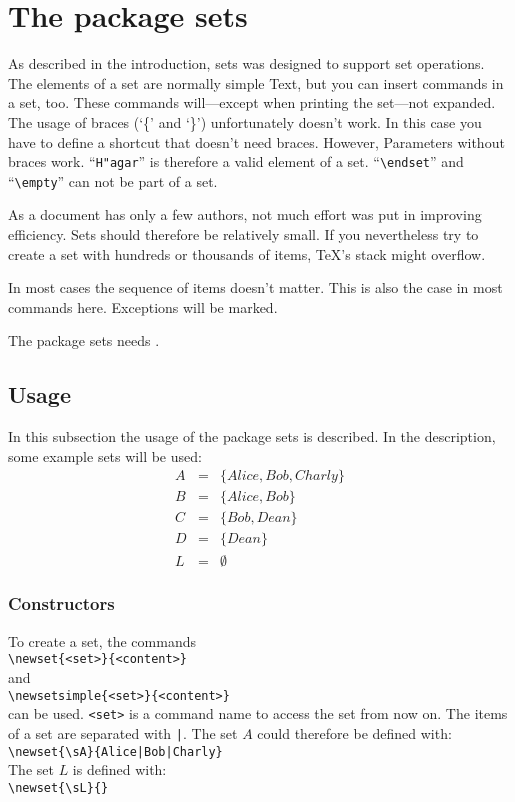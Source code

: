 \section{The package sets}\label{sets}

As described in the introduction, sets was designed to support set operations. The elements of a set are normally simple Text, but you can insert commands in a set, too.
These commands will---except when printing the set---not expanded.
The usage of braces (`\{' and `\}') unfortunately doesn't work. In this case you have to define a shortcut that doesn't need braces. However, Parameters without braces work.
``\verb|H"agar|'' is therefore a valid element of a set. ``\verb|\endset|''  and ``\verb|\empty|'' can not be part of a set.

As a document has only a few authors, not much effort was put in improving efficiency.
Sets should therefore be relatively small. If you nevertheless try to create a set with hundreds or thousands of items, \TeX's stack might overflow.

In most cases the sequence of items doesn't matter. This is also the case in most commands here. Exceptions will be marked.

The package sets needs \LaTeXe.

\subsection{Usage}\label{sets-usage}

In this subsection the usage of the package sets is described. In the description, some example sets will be used:
\begin{eqnarray*}
	A &=& \{Alice, Bob, Charly\}\\
	B &=& \{Alice, Bob\}\\
	C &=& \{Bob, Dean\}\\
	D &=& \{Dean\}\\
	L &=& \emptyset
\end{eqnarray*}

\subsubsection{Constructors}\label{constructors}
To create a set, the commands\\
\mbox{}\hspace{2em}\verb$\newset{<set>}{<content>}$\\
and\\
\mbox{}\hspace{2em}\verb$\newsetsimple{<set>}{<content>}$\\
can be used. \texttt{<set>} is a command name to access the set from now on.
The items of a set are separated with \texttt{|}. The set $A$ could therefore be defined with:\\
\mbox{}\hspace{2em}\verb$\newset{\sA}{Alice|Bob|Charly}$\\
The set $L$ is defined with:\\
\mbox{}\hspace{2em}\verb$\newset{\sL}{}$\\

